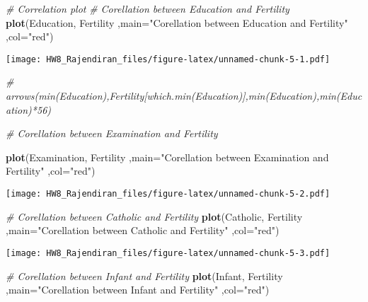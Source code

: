 \documentclass[]{article}
\newenvironment{Shaded}{\begin{snugshade}}{\end{snugshade}}
\newcommand{\CommentTok}[1]{\textcolor[rgb]{0.56,0.35,0.01}{\textit{#1}}}
\newcommand{\DataTypeTok}[1]{\textcolor[rgb]{0.13,0.29,0.53}{#1}}
\newcommand{\KeywordTok}[1]{\textcolor[rgb]{0.13,0.29,0.53}{\textbf{#1}}}
\newcommand{\NormalTok}[1]{#1}
\newcommand{\StringTok}[1]{\textcolor[rgb]{0.31,0.60,0.02}{#1}}
\begin{document}
\begin{Shaded}
\begin{Highlighting}[]
\CommentTok{# Correlation plot}
\CommentTok{# Corellation between Education and Fertility}
\KeywordTok{plot}\NormalTok{(Education, Fertility}
\NormalTok{     ,}\DataTypeTok{main=}\StringTok{"Corellation between Education and Fertility"}
\NormalTok{     ,}\DataTypeTok{col=}\StringTok{"red"}\NormalTok{)}
\end{Highlighting}
\end{Shaded}

\texttt{[image: HW8\_Rajendiran\_files/figure-latex/unnamed-chunk-5-1.pdf]}

\begin{Shaded}
\begin{Highlighting}[]
\CommentTok{# arrows(min(Education),Fertility[which.min(Education)],min(Education),min(Education)*56)}

\CommentTok{# Corellation between Examination and Fertility}

\KeywordTok{plot}\NormalTok{(Examination, Fertility}
\NormalTok{     ,}\DataTypeTok{main=}\StringTok{"Corellation between Examination and Fertility"}
\NormalTok{     ,}\DataTypeTok{col=}\StringTok{"red"}\NormalTok{)}
\end{Highlighting}
\end{Shaded}

\texttt{[image: HW8\_Rajendiran\_files/figure-latex/unnamed-chunk-5-2.pdf]}

\begin{Shaded}
\begin{Highlighting}[]
\CommentTok{# Corellation between Catholic and Fertility}
\KeywordTok{plot}\NormalTok{(Catholic, Fertility}
\NormalTok{     ,}\DataTypeTok{main=}\StringTok{"Corellation between Catholic and Fertility"}
\NormalTok{     ,}\DataTypeTok{col=}\StringTok{"red"}\NormalTok{)}
\end{Highlighting}
\end{Shaded}

\texttt{[image: HW8\_Rajendiran\_files/figure-latex/unnamed-chunk-5-3.pdf]}

\begin{Shaded}
\begin{Highlighting}[]
\CommentTok{# Corellation between Infant and Fertility}
\KeywordTok{plot}\NormalTok{(Infant, Fertility}
\NormalTok{     ,}\DataTypeTok{main=}\StringTok{"Corellation between Infant and Fertility"}
\NormalTok{     ,}\DataTypeTok{col=}\StringTok{"red"}\NormalTok{)}
\end{Highlighting}
\end{Shaded}
\end{document}
